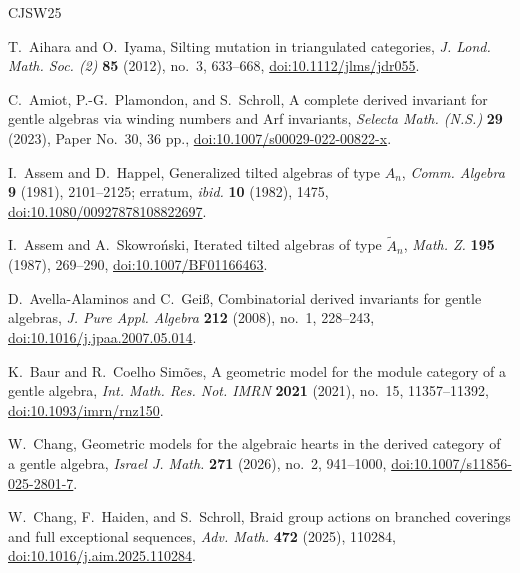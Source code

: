 \documentclass[11pt]{amsart}
\theoremstyle{definition}
\theoremstyle{plain}
\theoremstyle{definition}
\theoremstyle{definition}
\begin{document}
\begin{thebibliography}{CJSW25}
\footnotesize
\raggedright
\raggedbottom

T.~Aihara and O.~Iyama,
\newblock Silting mutation in triangulated categories,
\newblock \emph{J. Lond. Math. Soc. (2)} \textbf{85} (2012), no.~3,
633--668,
\newblock \href{https://doi.org/10.1112/jlms/jdr055}
{doi:10.1112/jlms/jdr055}.

C.~Amiot, P.-G.~Plamondon, and S.~Schroll,
\newblock A complete derived invariant for gentle algebras via winding
numbers and Arf invariants,
\newblock \emph{Selecta Math. (N.S.)} \textbf{29} (2023), Paper No.~30,
36 pp.,
\newblock \href{https://doi.org/10.1007/s00029-022-00822-x}
{doi:10.1007/s00029-022-00822-x}.

I.~Assem and D.~Happel,
\newblock Generalized tilted algebras of type $A_n$,
\newblock \emph{Comm. Algebra} \textbf{9} (1981), 2101--2125;
erratum, \emph{ibid.} \textbf{10} (1982), 1475,
\newblock \href{https://doi.org/10.1080/00927878108822697}
{doi:10.1080/00927878108822697}.


I.~Assem and A.~Skowro{\'n}ski,
\newblock Iterated tilted algebras of type $\widetilde A_n$,
\newblock \emph{Math. Z.} \textbf{195} (1987), 269--290,
\newblock \href{https://doi.org/10.1007/BF01166463}
{doi:10.1007/BF01166463}.

D.~Avella-Alaminos and C.~Gei{\ss},
\newblock Combinatorial derived invariants for gentle algebras,
\newblock \emph{J. Pure Appl. Algebra} \textbf{212} (2008), no.~1,
228--243,
\newblock \href{https://doi.org/10.1016/j.jpaa.2007.05.014}
{doi:10.1016/j.jpaa.2007.05.014}.


K.~Baur and R.~Coelho Sim\~oes,
\newblock A geometric model for the module category of a gentle algebra,
\newblock \emph{Int. Math. Res. Not. IMRN} \textbf{2021} (2021), no.~15,
11357--11392,
\newblock \href{https://doi.org/10.1093/imrn/rnz150}
{doi:10.1093/imrn/rnz150}.

W.~Chang,
\newblock Geometric models for the algebraic hearts in the derived category
of a gentle algebra,
\newblock \emph{Israel J. Math.} \textbf{271} (2026), no.~2, 941--1000,
\newblock
\href{https://doi.org/10.1007/s11856-025-2801-7}
{doi:10.1007/s11856-025-2801-7}.


W.~Chang, F.~Haiden, and S.~Schroll,
\newblock Braid group actions on branched coverings and full
exceptional sequences,
\newblock \emph{Adv. Math.} \textbf{472} (2025), 110284,
\newblock \href{https://doi.org/10.1016/j.aim.2025.110284}
{doi:10.1016/j.aim.2025.110284}.


\end{thebibliography}
\end{document}
